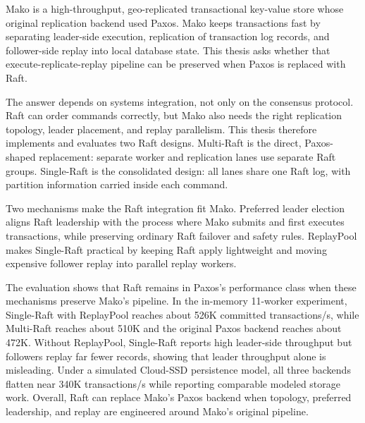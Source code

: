 \noindent
Mako is a high-throughput, geo-replicated transactional key-value store whose
original replication backend used Paxos. Mako keeps transactions fast by
separating leader-side execution, replication of transaction log records, and
follower-side replay into local database state. This thesis asks whether that
execute-replicate-replay pipeline can be preserved when Paxos is replaced with
Raft.

The answer depends on systems integration, not only on the consensus protocol.
Raft can order commands correctly, but Mako also needs the right replication
topology, leader placement, and replay parallelism. This thesis therefore
implements and evaluates two Raft designs. Multi-Raft is the direct,
Paxos-shaped replacement: separate worker and replication lanes use separate
Raft groups. Single-Raft is the consolidated design: all lanes share one Raft
log, with partition information carried inside each command.

Two mechanisms make the Raft integration fit Mako. Preferred leader election
aligns Raft leadership with the process where Mako submits and first executes
transactions, while preserving ordinary Raft failover and safety rules.
ReplayPool makes Single-Raft practical by keeping Raft apply lightweight and
moving expensive follower replay into parallel replay workers.

The evaluation shows that Raft remains in Paxos's performance class when these
mechanisms preserve Mako's pipeline. In the in-memory 11-worker experiment,
Single-Raft with ReplayPool reaches about 526K committed transactions/s, while
Multi-Raft reaches about 510K and the original Paxos backend reaches about
472K. Without ReplayPool, Single-Raft reports high leader-side throughput but
followers replay far fewer records, showing that leader throughput alone is
misleading. Under a simulated Cloud-SSD persistence model, all three backends
flatten near 340K transactions/s while reporting comparable modeled storage
work. Overall, Raft can replace Mako's Paxos backend when topology, preferred
leadership, and replay are engineered around Mako's original pipeline.
